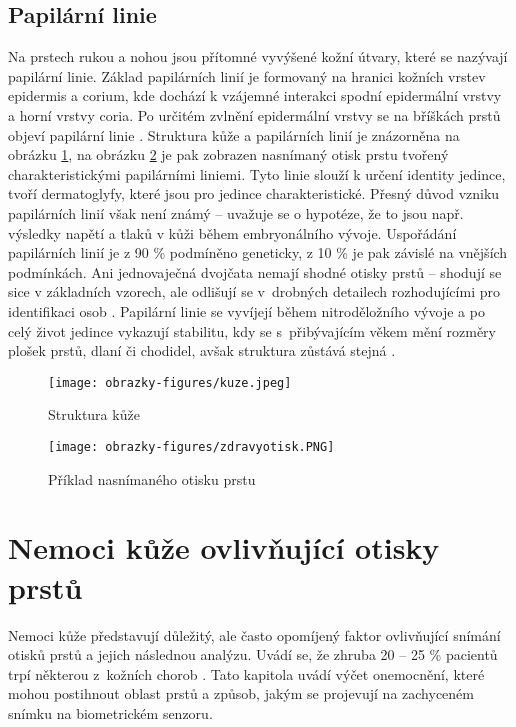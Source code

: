 \subsection*{Papilární linie}
Na prstech rukou a nohou jsou přítomné vyvýšené kožní útvary, které se nazývají papilární linie. Základ papilárních linií je formovaný na hranici kožních vrstev epidermis a corium, kde dochází k vzájemné interakci spodní epidermální vrstvy a horní vrstvy coria. Po určitém zvlnění epidermální vrstvy se na bříškách prstů objeví papilární linie \cite{DermatologickeFaktory}. Struktura kůže a papilárních linií je znázorněna na obrázku \ref{fig:kuze}, na obrázku \ref{fig:zdravyotisk} je pak zobrazen nasnímaný otisk prstu tvořený charakteristickými papilárními liniemi. Tyto linie slouží k určení identity jedince, tvoří dermatoglyfy, které jsou pro jedince charakteristické. Přesný důvod vzniku papilárních linií však není známý -- uvažuje se o hypotéze, že to jsou např. výsledky napětí a tlaků v kůži během embryonálního vývoje. Uspořádání papilárních linií je z 90 \% podmíněno geneticky, z 10 \% je pak závislé na vnějších podmínkách. Ani jednovaječná dvojčata nemají shodné otisky prstů -- shodují se sice v základních vzorech, ale odlišují se v~drobných detailech rozhodujícími pro identifikaci osob \cite{Dermatoglyfika}. Papilární linie se vyvíjejí během nitroděložního vývoje a po celý život jedince vykazují stabilitu, kdy se s~přibývajícím věkem mění rozměry plošek prstů, dlaní či chodidel, avšak struktura zůstává stejná \cite{DermatologickeFaktory}. \\

\begin{figure}[!htbp]
    \centering
    \texttt{[image: obrazky-figures/kuze.jpeg]}
    \caption{Struktura kůže \cite{DermatologickeFaktory}}
    \label{fig:kuze}
\end{figure}

\begin{figure}[!htbp]
    \centering
    \texttt{[image: obrazky-figures/zdravyotisk.PNG]}
    \caption{Příklad nasnímaného otisku prstu \cite{BIOotiskyLecture}}
    \label{fig:zdravyotisk}
\end{figure}

\section{Nemoci kůže ovlivňující otisky prstů}
\label{sec:nemoci}
Nemoci kůže představují důležitý, ale často opomíjený faktor ovlivňující snímání otisků prstů a jejich následnou analýzu. Uvádí se, že zhruba 20 -- 25 \% pacientů trpí některou z~kožních chorob \cite{InfluenceSkinDiseases}. Tato kapitola uvádí výčet onemocnění, které mohou postihnout oblast prstů a způsob, jakým se projevují na zachyceném snímku na biometrickém senzoru. 
